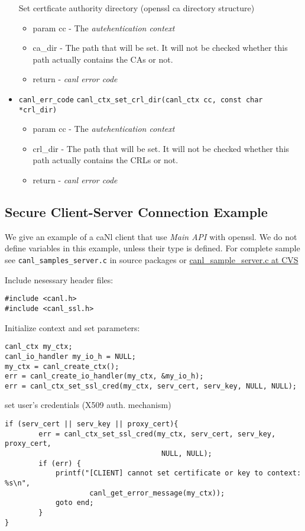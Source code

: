 \begin{itemize}
  Set certficate authority directory (openssl ca directory structure)
    \begin{itemize} 
    \item param cc - The \textit{autehentication context}
    \item ca\_dir - The path that will be set.  It will not be 
    checked whether this path actually contains the CAs or not.
    \item return - \textit{canl error code}
    \end{itemize}
  \item \verb'canl_err_code'
  \verb'canl_ctx_set_crl_dir(canl_ctx cc, const char *crl_dir)'
    \begin{itemize} 
    \item param cc - The \textit{autehentication context}
    \item crl\_dir - The path that will be set.  It will not be 
    checked whether this path actually contains the CRLs or not.
    \item return - \textit{canl error code}
    \end{itemize}

\end{itemize}
\subsection{Secure Client-Server Connection Example}
We give an example of a caNl client that use \textit{Main API} 
with openssl. We do not define variables in this example, unless
their type is \CANL defined. For complete sample see 
{\tt canl\_samples\_server.c} in source packages or \href{http://glite.cvs.cern.ch/cgi-bin/glite.cgi/emi.canl.canl-c/examples/canl\_sample\_server.c?revision=HEAD}{canl\_sample\_server.c at CVS}

Include nesessary header files:
\begin{lstlisting}
#include <canl.h>
#include <canl_ssl.h>
\end{lstlisting}

Initialize context and set parameters:
\begin{lstlisting}
canl_ctx my_ctx;
canl_io_handler my_io_h = NULL;
my_ctx = canl_create_ctx();
err = canl_create_io_handler(my_ctx, &my_io_h);
err = canl_ctx_set_ssl_cred(my_ctx, serv_cert, serv_key, NULL, NULL);
\end{lstlisting}

set user's credentials (X509 auth. mechanism)
\begin{lstlisting}
if (serv_cert || serv_key || proxy_cert){
        err = canl_ctx_set_ssl_cred(my_ctx, serv_cert, serv_key, proxy_cert,
                                     NULL, NULL);
        if (err) {
            printf("[CLIENT] cannot set certificate or key to context: %s\n",
                    canl_get_error_message(my_ctx));
            goto end;
        }
}
\end{lstlisting}

